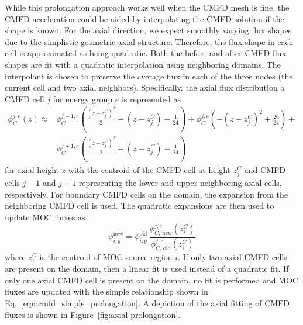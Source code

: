 While this prolongation approach works well when the \ac{CMFD} mesh is fine, the \ac{CMFD} acceleration could be aided by interpolating the \ac{CMFD} solution if the shape is known. For the axial direction, we expect smoothly varying flux shapes due to the simplistic geometric axial structure. Therefore, the flux shape in each cell is approximated as being quadratic. Both the before and after \ac{CMFD} flux shapes are fit with a quadratic interpolation using neighboring domains. The interpolant is chosen to preserve the average flux in each of the three nodes (the current cell and two axial neighbors). Specifically, the axial flux distribution a \ac{CMFD} cell $j$ for energy group $e$ is represented as
\begin{equation}
\begin{split}
\phi_C^{j,e}(z) \approx & \phi_C^{j-1,e}\left(\frac{\left(z-z^C_j \right)^2}{2} - \left(z-z^C_j \right) - \frac{1}{24} \right) + \phi_C^{j,e}\left(-\left(z-z^C_j \right)^2 + \frac{26}{24} \right) + \\ & \phi_C^{j+1,e}\left(\frac{\left(z-z^C_j \right)^2}{2} - \left(z-z^C_j \right) - \frac{1}{24} \right)
\end{split}
\end{equation}
for axial height $z$ with the centroid of the \ac{CMFD} cell at height $z^C_{j}$ and \ac{CMFD} cells $j-1$ and $j+1$ representing the lower and upper neighboring axial cells, respectively. For boundary \ac{CMFD} cells on the domain, the expansion from the neighboring \ac{CMFD} cell is used. The quadratic expansions are then used to update \ac{MOC} fluxes as
\begin{equation}
\phi_{i,g}^{\text{new}} = \phi_{i,g}^{\text{old}} \, \frac{\phi_{C, \, \text{new}}^{j,e}(z^C_i)}{\phi_{C, \, \text{old}}^{j,e}(z^C_i)}
\label{eq:axial-prolongation}
\end{equation} 
where $z^C_i$ is the centroid of \ac{MOC} source region $i$. If only two axial \ac{CMFD} cells are present on the domain, then a linear fit is used instead of a quadratic fit. If only one axial \ac{CMFD} cell is present on the domain, no fit is performed and \ac{MOC} fluxes are updated with the simple relationship shown in Eq.~\ref{eqn:cmfd_simple_prolongation}. A depiction of the axial fitting of \ac{CMFD} fluxes is shown in Figure~\ref{fig:axial-prolongation}.

